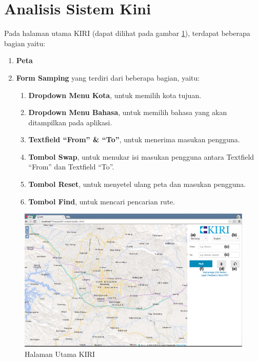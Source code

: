 \section{Analisis Sistem Kini}
\label{sec:analisiskini}
Pada halaman utama KIRI (dapat dilihat pada gambar \ref{fig:3_KIRI_main}), terdapat beberapa bagian yaitu:

\begin{enumerate}
    		\item \textbf{Peta}
    		\item \textbf{Form Samping} yang terdiri dari beberapa bagian, yaitu:
    		\begin{enumerate}
    			\item \textbf{Dropdown Menu Kota}, untuk memilih kota tujuan.
    			\item \textbf{Dropdown Menu Bahasa}, untuk memilih bahasa yang akan ditampilkan pada aplikasi.
    			\item \textbf{Textfield ``From'' \& ``To''}, untuk menerima masukan pengguna.
    			\item \textbf{Tombol Swap}, untuk menukar isi masukan pengguna antara Textfield ``From'' dan Textfield ``To''.
    			\item \textbf{Tombol Reset}, untuk menyetel ulang peta dan masukan pengguna.
    			\item \textbf{Tombol Find}, untuk mencari pencarian rute.
    		\end{enumerate}
\end{enumerate}

\begin{figure}[H]
	\centering
	\includegraphics[scale=0.3]{Gambar/KIRI-main}
	\caption{Halaman Utama KIRI} 
	\label{fig:3_KIRI_main}
\end{figure}


